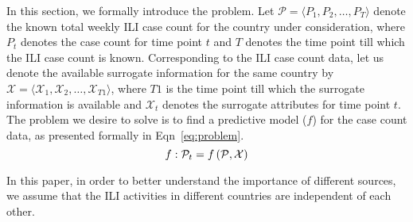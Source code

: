 In this section, we formally introduce the problem. Let
$\mathcal{P} = \langle {P}_1, {P}_2, \dots,{P}_T \rangle$
denote the known total weekly ILI case count for the country under
consideration, where ${P}_t$  denotes the case count for
time point $t$ and $T$ denotes the time point till which the
ILI case count is known.
Corresponding to the ILI case count data, let us denote the available surrogate information
for the same country
 by 
$\mathcal{X} = \langle \mathcal{X}_1, \mathcal{X}_2, \dots, \mathcal{X}_{T1}\rangle$, 
where $T1$ is the time point till which the surrogate
information is available and $\mathcal{X}_{t}$ denotes the surrogate attributes for time
point $t$. 
The problem we desire to solve is to find a predictive model ($f$) for the 
case count data, as presented formally in Eqn~\ref{eq:problem}.
\vspace{-1em}
\begin{equation}
  \label{eq:problem}
  f: \mathcal{P}_t = f\left(\mathcal{P}, \mathcal{X}\right)
    \vspace{-1em}
\end{equation}

In this paper, in order to better understand the importance of different sources,
we assume that the ILI activities in different countries are
independent of each other.
\vspace{-1em}

